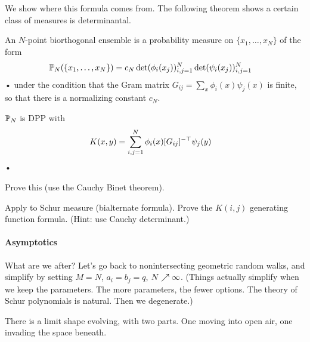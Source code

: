 We show where this formula comes from. 
The following theorem shows a certain class of measures is determinantal.
\begin{df}
An $N$-point biorthogonal ensemble is a probability measure on $\{x_1,\ldots, x_N\}$ of the form
\begin{align*}
\mathbb{P}_N(\{x_1,\ldots, x_N\}) &= c_N \det(\phi_i(x_j))_{i,j=1}^N \det(\psi_i(x_j))_{i,j=1}^N
\end{align*}•
under the condition that the Gram matrix $G_{ij} = \sum_x \phi_i(x)\psi_j(x)$ is finite, so that there is a normalizing constant $c_N$.
\end{df}
\begin{thm}
$\mathbb{P}_N$ is DPP with 
\begin{align*}
K(x,y) &= \sum_{i,j=1}^{N} \phi_i(x)[G_{ij}]^{-\top} \psi_j(y)
\end{align*}•
\end{thm}
\begin{exr}
Prove this (use the Cauchy Binet theorem). %
\end{exr}
\begin{exr}
Apply to Schur measure (bialternate formula). Prove the $K(i,j)$ generating function formula. (Hint: use Cauchy determinant.)
\end{exr}

\paragraph{Asymptotics}

What are we after? Let's go back to nonintersecting geometric random walks, and simplify by setting $M=N$, $a_i=b_j=q$, $N\nearrow \infty$. (Things actually simplify when we keep the parameters. The more parameters, the fewer options. The theory of Schur polynomials is natural. Then we degenerate.) %

There is a limit shape evolving, with two parts. One moving into open air, one invading the space beneath.

